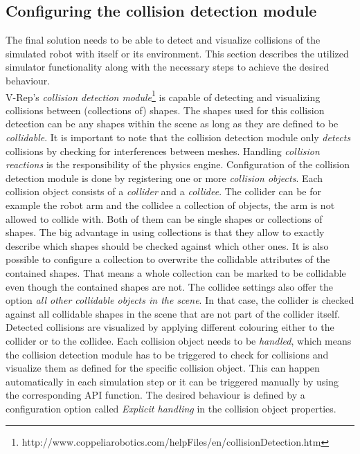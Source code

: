 \subsection{Configuring the collision detection module}
\label{sec:config_col}

The final solution needs to be able to detect and visualize collisions of the simulated robot with itself or its environment. This section describes the utilized simulator functionality along with the necessary steps to achieve the desired behaviour. \\

V-Rep's \emph{collision detection module}\footnote{http://www.coppeliarobotics.com/helpFiles/en/collisionDetection.htm} is capable of detecting and visualizing collisions between (collections of) shapes. The shapes used for this collision detection can be any shapes within the scene as long as they are defined to be \emph{collidable}. It is important to note that the collision detection module only \textit{detects} collisions by checking for interferences between meshes. Handling \emph{collision reactions} is the responsibility of the  physics engine. Configuration of the collision detection module is done by registering one or more \emph{collision objects}. Each collision object consists of a \emph{collider} and a \emph{collidee}. The collider can be for example the robot arm and the collidee a collection of objects, the arm is not allowed to collide with. Both of them can be single shapes or collections of shapes. The big advantage in using collections is that they allow to exactly describe which shapes should be checked against which other ones. It is also possible to configure a collection to overwrite the collidable attributes of the contained shapes. That means a whole collection can be marked to be collidable even though the contained shapes are not. The collidee settings also offer the option \emph{all other collidable objects in the scene}. In that case, the collider is checked against all collidable shapes in the scene that are not part of the collider itself. Detected collisions are visualized by applying different colouring either to the collider or to the collidee. Each collision object needs to be \emph{handled}, which means the collision detection module has to be triggered to check for collisions and visualize them as defined for the specific collision object. This can happen automatically in each simulation step or it can be triggered manually by using the corresponding API function. The desired behaviour is defined by a configuration option called \emph{Explicit handling} in the collision object properties. \\

